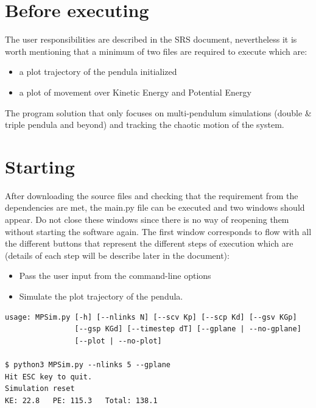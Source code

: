 \documentclass[12pt, titlepage]{article}
\begin{document}
\section{Before executing \progname{}}

The user responsibilities are described in the SRS document, nevertheless it 
is worth mentioning that a minimum of two files are required to execute 
\progname{} which are:
\begin{itemize}
\item a plot trajectory of the pendula initialized
\item a plot of movement over Kinetic Energy and Potential Energy
\end{itemize}
The \progname program solution that only focuses on multi-pendulum 
simulations (double \& triple pendula and beyond) and tracking the chaotic
motion of the system.

\section{Starting \progname{}}

After downloading the source files and checking that the requirement from the 
dependencies are met, the main.py file can be executed and two windows should 
appear. Do not close these windows since there is no way of reopening them 
without starting the software again. The first window %
corresponds to \progname{} flow with all the different buttons that represent 
the different steps of execution which are 
(details of each step will be describe later in the document):

\begin{itemize}
\item %
Pass the user input from the command-line options

\item %
Simulate the plot trajectory of the pendula.
\end{itemize}

\begin{lstlisting}
usage: MPSim.py [-h] [--nlinks N] [--scv Kp] [--scp Kd] [--gsv KGp]
                [--gsp KGd] [--timestep dT] [--gplane | --no-gplane]
                [--plot | --no-plot]

$ python3 MPSim.py --nlinks 5 --gplane
Hit ESC key to quit.
Simulation reset
KE: 22.8   PE: 115.3   Total: 138.1
\end{lstlisting}
\end{document}
